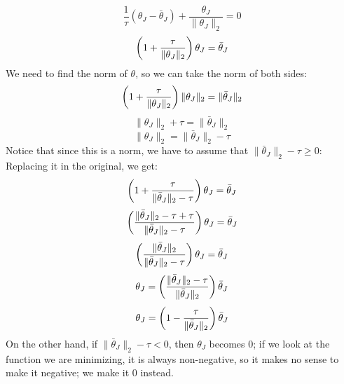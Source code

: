 \documentclass[12pt]{article}
\begin{document}
\begin{enumerate}[label = \letters]
    \[ \frac{1}{\tau}(\theta_J - \bar{\theta}_J) 
    + \dfrac{\theta_J}{\|\theta_J\|_2} = 0 \]
    \[ \left( 1+\frac{\tau}{\|\theta_J\|_2} \right)
    \theta_J = \bar{\theta}_J \]
    We need to find the norm of $\theta$,
    so we can take the norm of both sides:
    \[ \left( 1+\frac{\tau}{\|\theta_J\|_2} \right)
    \|\theta_J\|_2 = \|\bar{\theta}_J\|_2 \]
    \[ \|\theta_J\|_2 +\tau = \|\bar{\theta}_J\|_2 \]
    \[ \|\theta_J\|_2 = \|\bar{\theta}_J\|_2 - \tau \]
    Notice that since this is a norm,
    we have to assume that 
    $\|\bar{\theta}_J\|_2 - \tau \geq 0$:
    Replacing it in the original, we get:
    \[ \left( 1+\frac{\tau}{\|\bar{\theta}_J\|_2 - \tau} \right)
    \theta_J = \bar{\theta}_J \]
    \[ \left( \frac{\|\bar{\theta}_J\|_2 - \tau +
    \tau}{\|\bar{\theta}_J\|_2 - \tau} \right)
    \theta_J = \bar{\theta}_J \]
    \[ \left( \frac{\|\bar{\theta}_J\|_2}
    {\|\bar{\theta}_J\|_2 - \tau} \right)
    \theta_J = \bar{\theta}_J \]
    \[\theta_J = \left( \frac{\|\bar{\theta}_J\|_2 - \tau}
    {\|\bar{\theta}_J\|_2} \right)\bar{\theta}_J \]
    \[\theta_J = \left( 1 -\frac{\tau}
    {\|\bar{\theta}_J\|_2} \right)\bar{\theta}_J \]
    On the other hand, if $\|\bar{\theta}_J\|_2 - \tau < 0$,
    then $\theta_J$ becomes $0$; if we look at the
    function we are minimizing, it is always non-negative,
    so it makes no sense to make it negative;
    we make it 0 instead. \\
\end{enumerate}




\newpage
\end{document}
